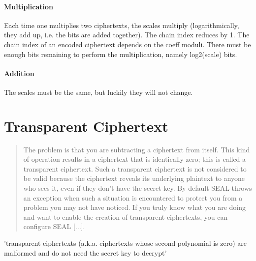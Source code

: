 \paragraph{Multiplication}
Each time one multiplies two ciphertexts, the scales multiply (logarithmically, they add up, i.e. the bits are added together).
The chain index reduces by 1. The chain index of an encoded ciphertext depends on the coeff moduli.
There must be enough bits remaining to perform the multiplication, namely log2(scale) bits.

\paragraph{Addition}
The scales must be the same, but luckily they will not change.

\section{Transparent Ciphertext}
\begin{quote}
  The problem is that you are subtracting a ciphertext from itself.
  This kind of operation results in a ciphertext that is identically zero;
  this is called a transparent ciphertext. Such a transparent ciphertext
  is not considered to be valid because the ciphertext reveals its underlying plaintext to anyone who sees it,
  even if they don't have the secret key.
  By default SEAL throws an exception when such a situation is encountered to protect you from a problem you may not have noticed.
  If you truly know what you are doing and want to enable the creation of transparent ciphertexts,
  you can configure SEAL [...].
  \parencite{kim-laine-on-transparent-ciphertexts}
\end{quote}

'transparent ciphertexts (a.k.a. ciphertexts whose second polynomial is zero) are malformed and do not need the secret key to decrypt'
